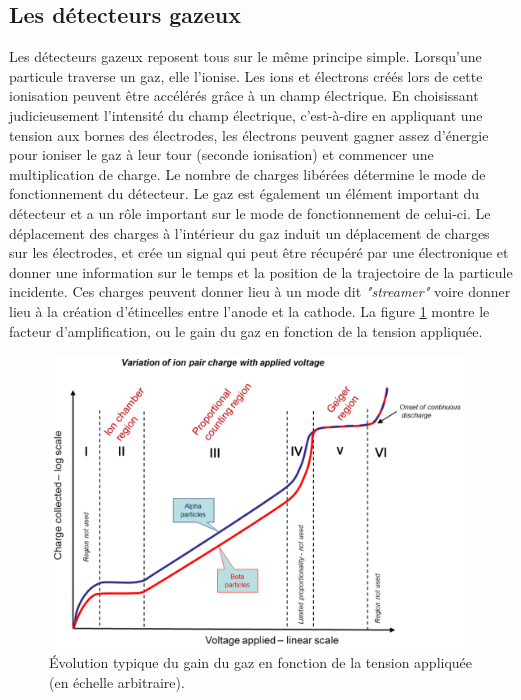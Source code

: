 \subsection{Les détecteurs gazeux}
Les détecteurs gazeux reposent tous sur le même principe simple. Lorsqu'une particule traverse un gaz, elle l'ionise. Les ions et électrons créés lors de cette ionisation peuvent être accélérés grâce à un champ électrique. En choisissant judicieusement l'intensité du champ électrique, c'est-à-dire en appliquant une tension aux bornes des électrodes, les électrons peuvent gagner assez d'énergie pour ioniser le gaz à leur tour (seconde ionisation) et commencer une multiplication de charge. Le nombre de charges libérées détermine le mode de fonctionnement du détecteur. Le gaz est également un élément important du détecteur et a un rôle important sur le mode de fonctionnement de celui-ci. Le déplacement des charges à l'intérieur du gaz induit un déplacement de charges sur les électrodes, et crée un signal qui peut être récupéré par une électronique et donner une information sur le temps et la position de la trajectoire de la particule incidente. Ces charges peuvent donner lieu à un mode dit \textit{"streamer"} voire donner lieu à la création d'étincelles entre l'anode et la cathode. La figure \ref{mult} montre le facteur d'amplification, ou le gain du gaz en fonction de la tension appliquée. 

\begin{figure}[ht!]
	\centering
	\includegraphics[width=0.98\textwidth]{RPC/gasgain.png}
	\captionsetup{type=subfigure}\caption{Évolution typique du gain du gaz en fonction de la tension appliquée (en échelle arbitraire).}
	\label{mult}
\end{figure}


